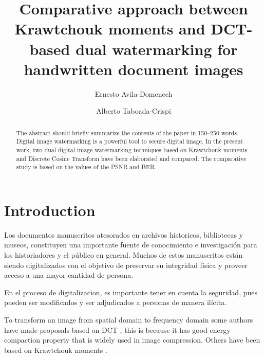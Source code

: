\documentclass[runningheads]{llncs}
\begin{document}
%
\title{Comparative approach between Krawtchouk moments and DCT-based dual watermarking for handwritten document images}
%
%
\author{Ernesto Avila-Domenech \and
Alberto Taboada-Crispi}
%
%
%
\maketitle              %
%
\begin{abstract}
The abstract should briefly summarize the contents of the paper in
150--250 words. Digital image watermarking is a powerful tool to secure digital image. In the present work, two dual digital image watermarking techniques based on Krawtchouk moments and Discrete Cosine Transform have been elaborated and compared. The comparative study is based on the values of the PSNR and BER.

\end{abstract}
%
%
%
\section{Introduction}
Los documentos manuscritos atesorados en archivos historicos, bibliotecas y museos, constituyen una importante fuente de conocimiento e investigación para los historiadores y el público en general. Muchos de estos manuscritos están siendo digitalizados con el objetivo de preservar su integridad física y proveer acceso a una mayor cantidad de persona.

En el proceso de digitalizacion, es importante tener en cuenta la seguridad, pues pueden ser modificados y ser adjudicados a personas de manera ilícita.

To transform an image from spatial domain to frequency domain some authors have made proposals based on DCT \cite{munoz2018robust,wang2018blind}, this is because it has good energy compaction property that is widely used in image compression. Others have been based on Krawtchouk moments \cite{papakostas2014moment,liu2017fractional,Yap2004}.
\end{document}
